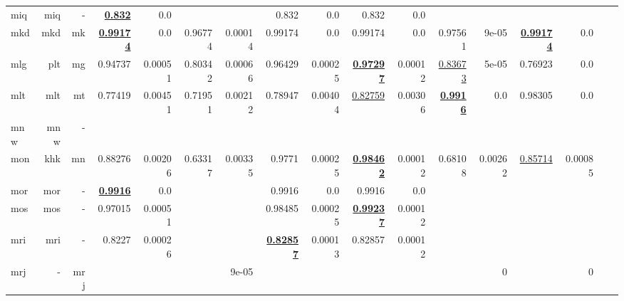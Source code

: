 \documentclass[11pt]{article}
\begin{document}
\begin{table*}[h]
{\begin{tabular}{lrrrrrrrrrrrrrrrr}
miq         & miq         & -         & \textbf{\underline{0.832}}         & 0.0         &          &          & 0.832         & 0.0         & 0.832         & 0.0         &          &          &          &          \\
mkd         & mkd         & mk         & \textbf{\underline{0.99174}}         & 0.0         & 0.96774         & 0.00014         & 0.99174         & 0.0         & 0.99174         & 0.0         & 0.97561         & 9e-05         & \textbf{\underline{0.99174}}         & 0.0         \\
mlg         & plt         & mg         & 0.94737         & 0.00051         & 0.80342         & 0.00066         & 0.96429         & 0.00025         & \textbf{\underline{0.97297}}         & 0.00012         & \underline{0.83673}         & 5e-05         & 0.76923         & 0.0         \\
mlt         & mlt         & mt         & 0.77419         & 0.00451         & 0.71951         & 0.00212         & 0.78947         & 0.00404         & \underline{0.82759}         & 0.00306         & \textbf{\underline{0.9916}}         & 0.0         & 0.98305         & 0.0         \\
mnw         & mnw         & -         &          &          &          &          &          &          &          &          &          &          &          &          \\
mon         & khk         & mn         & 0.88276         & 0.00206         & 0.63317         & 0.00335         & 0.9771         & 0.00025         & \textbf{\underline{0.98462}}         & 0.00012         & 0.68108         & 0.00262         & \underline{0.85714}         & 0.00085         \\
mor         & mor         & -         & \textbf{\underline{0.9916}}         & 0.0         &          &          & 0.9916         & 0.0         & 0.9916         & 0.0         &          &          &          &          \\
mos         & mos         & -         & 0.97015         & 0.00051         &          &          & 0.98485         & 0.00025         & \textbf{\underline{0.99237}}         & 0.00012         &          &          &          &          \\
mri         & mri         & -         & 0.8227         & 0.00026         &          &          & \textbf{\underline{0.82857}}         & 0.00013         & 0.82857         & 0.00012         &          &          &          &          \\
mrj         & -         & mrj         &          &          &          & 9e-05         &          &          &          &          &          & 0         &          & 0         \\

\end{tabular}}
\end{table*}
\end{document}
